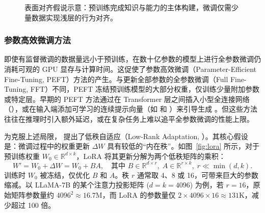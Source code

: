 \begin{figure}[htbp]
\centering
{}
\caption{表面对齐假说示意：预训练完成知识与能力的主体构建，微调仅需少量数据实现浅层的行为对齐。}
\label{fig:alignment-hypothesis}
\end{figure}



\subsubsection{参数高效微调方法}

即使有监督微调的数据量远小于预训练，在数十亿参数的模型上进行全参数微调仍消耗可观的 GPU 显存与计算时间。这促使了参数高效微调（Parameter-Efficient Fine-Tuning, PEFT）方法的产生。与更新全部参数的全参数微调（Full Fine-Tuning, FFT）不同，PEFT 冻结预训练模型的大部分权重，仅训练少量附加参数或特定层。早期的 PEFT 方法通过在 Transformer 层之间插入小型全连接网络（）\cite{houlsby-etal:2019adapter}，或在输入端添加可学习的连续提示向量（如  和 ）来引导生成 \cite{li-liang:2021prefix,lester-etal:2021prompt}。但这些方法往往在推理时引入额外延迟，或在复杂任务上难以追平全参数微调的性能上限。

为克服上述局限，\citet{hu-etal:2021lora} 提出了低秩自适应（Low-Rank Adaptation, ）。其核心假设是：微调过程中的权重更新 $\Delta W$ 具有较低的“内在秩”。如图~\ref{fig:lora} 所示，对于预训练权重 $W_0 \in \mathbb{R}^{d \times k}$，LoRA 将其更新分解为两个低秩矩阵的乘积：
\begin{equation}
W' = W_0 + \Delta W = W_0 + B A,\quad \text{其中 } B \in \mathbb{R}^{d \times r},\; A \in \mathbb{R}^{r \times k},\; r \ll \min(d,k).
\end{equation}
训练时 $W_0$ 被冻结，仅优化 $B$ 和 $A$。秩 $r$ 通常取 4、8 或 16，可带来巨大的参数缩减。以 LLaMA-7B 的某个注意力投影矩阵 ($d=k=4096$) 为例，若 $r=16$，原始矩阵参数量约 $4096^2 \approx 16.7\text{M}$，而 LoRA 的参数量仅 $2 \times 4096 \times 16 \approx 131\text{K}$，减少超过 100 倍。

